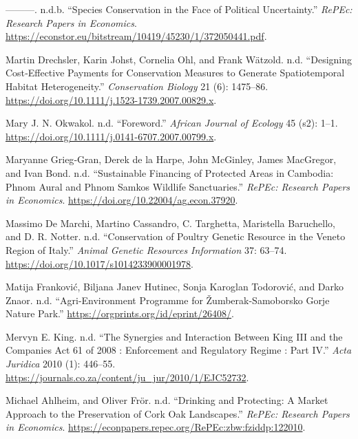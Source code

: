 \begin{CSLReferences}{1}{0}
---------. n.d.b. {``Species Conservation in the Face of Political
Uncertainty.''} \emph{RePEc: Research Papers in Economics}.
\url{https://econstor.eu/bitstream/10419/45230/1/372050441.pdf}.

Martin Drechsler, Karin Johst, Cornelia Ohl, and Frank Wätzold. n.d.
{``Designing Cost‐Effective Payments for Conservation Measures to
Generate Spatiotemporal Habitat Heterogeneity.''} \emph{Conservation
Biology} 21 (6): 1475--86.
\url{https://doi.org/10.1111/j.1523-1739.2007.00829.x}.

Mary J. N. Okwakol. n.d. {``Foreword.''} \emph{African Journal of
Ecology} 45 (s2): 1--1.
\url{https://doi.org/10.1111/j.0141-6707.2007.00799.x}.

Maryanne Grieg‐Gran, Derek de la Harpe, John McGinley, James MacGregor,
and Ivan Bond. n.d. {``Sustainable Financing of Protected Areas in
Cambodia: Phnom Aural and Phnom Samkos Wildlife Sanctuaries.''}
\emph{RePEc: Research Papers in Economics}.
\url{https://doi.org/10.22004/ag.econ.37920}.

Massimo De Marchi, Martino Cassandro, C. Targhetta, Maristella
Baruchello, and D. R. Notter. n.d. {``Conservation of Poultry Genetic
Resource in the Veneto Region of Italy.''} \emph{Animal Genetic
Resources Information} 37: 63--74.
\url{https://doi.org/10.1017/s1014233900001978}.

Matija Franković, Biljana Janev Hutinec, Sonja Karoglan Todorović, and
Darko Znaor. n.d. {``Agri-Environment Programme for Žumberak-Samoborsko
Gorje Nature Park.''} \url{https://orgprints.org/id/eprint/26408/}.

Mervyn E. King. n.d. {``The Synergies and Interaction Between King III
and the Companies Act 61 of 2008 : Enforcement and Regulatory Regime :
Part IV.''} \emph{Acta Juridica} 2010 (1): 446--55.
\url{https://journals.co.za/content/ju_jur/2010/1/EJC52732}.

Michael Ahlheim, and Oliver Frör. n.d. {``Drinking and Protecting: A
Market Approach to the Preservation of Cork Oak Landscapes.''}
\emph{RePEc: Research Papers in Economics}.
\url{https://econpapers.repec.org/RePEc:zbw:fziddp:122010}.


\end{CSLReferences}
